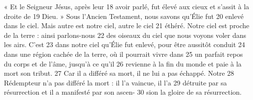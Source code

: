 « Et le Seigneur Jésus, après leur	 
18	 	avoir parlé, fut élevé aux cieux et s'assit à la droite de	 
19	 	Dieu. » Sous l'Ancien Testament, nous savons qu'Élie fut	 
20	 	enlevé dans le ciel. Mais autre est notre ciel, autre le ciel	 
21	 	éthéré. Notre ciel est proche de la terre : ainsi parlons-nous	 
22	 	des oiseaux du ciel que nous voyons voler dans les airs. C'est	 
23	 	dans notre ciel qu'Élie fut enlevé, pour être aussitôt conduit	 
24	 	dans une région cachée de la terre, où il pourrait vivre dans	 
25	 	un parfait repos du corps et de l'âme, jusqu'à ce qu'il	 
26	 	revienne à la fin du monde et paie à la mort son tribut.	 
27	 	Car il a différé sa mort, il ne lui a pas échappé. Notre	 
28	 	Rédempteur n'a pas différé la mort : il l'a vaincue, il l'a	 
29	 	détruite par sa résurrection et il a manifesté par son ascen-	 
30	 	sion la gloire de sa résurrection.